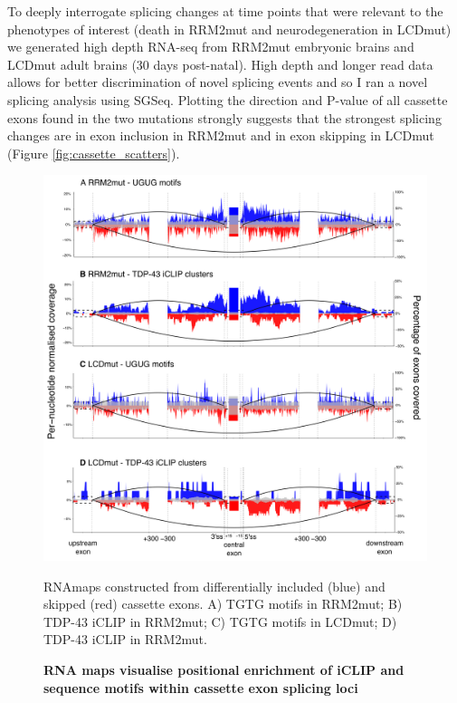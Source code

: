 To deeply interrogate splicing changes at time points that were relevant to the phenotypes of interest (death in RRM2mut and neurodegeneration in LCDmut) we generated high depth RNA-seq from RRM2mut embryonic brains and LCDmut adult brains (30 days post-natal). High depth and longer read data allows for better discrimination of novel splicing events and so I ran a novel splicing analysis using SGSeq. Plotting the direction and P-value of all cassette exons found in the two mutations strongly suggests that the strongest splicing changes are in exon inclusion in RRM2mut and in exon skipping in LCDmut (Figure \ref{fig:cassette_scatters}).

\begin{figure}[h]
	\centering
	\includegraphics[width=14cm]{Figures/05_tdp_mice/RNAmap_cassettes.png}
	\caption{\textbf{RNA maps visualise positional enrichment of iCLIP and sequence motifs within cassette exon splicing loci}}
	RNAmaps constructed from differentially included (blue) and skipped (red) cassette exons.  A) TGTG motifs in RRM2mut; B) TDP-43 iCLIP in RRM2mut; C) TGTG motifs in LCDmut; D) TDP-43 iCLIP in RRM2mut.
	
	\label{fig:RNAmap_cassettes}
\end{figure}

